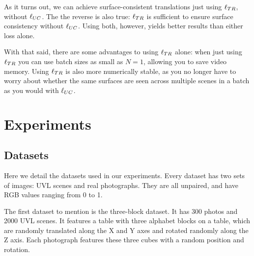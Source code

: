 \documentclass{article}
\begin{document}
		As it turns out, we can achieve surface-consistent translations just using $\ell_{TR}$, without $\ell_{UC}$.
		The the reverse is also true: $\ell_{TR}$ is sufficient to ensure surface consistency without $\ell_{UC}$.
		Using both, however, yields better results than either loss alone. 
		
		With that said, there are some advantages to using $\ell_{TR}$ alone: when just using $\ell_{TR}$ you can use batch sizes as small as $N=1$, allowing you to save video memory. 
		Using $\ell_{TR}$ is also more numerically stable, as you no longer have to worry about whether the same surfaces are seen across multiple scenes in a batch as you would with $\ell_{UC}$.





\section{Experiments}\label{sec:results}

\subsection{Datasets}
Here we detail the datasets used in our experiments. 
Every dataset has two sets of images: UVL scenes and real photographs. They are all unpaired, and have RGB values ranging from 0 to 1.

The first dataset to mention is the three-block dataset.  
It has 300 photos and 2000 UVL scenes. It features a table with three alphabet blocks on a table, which are randomly translated along the X and Y axes and rotated randomly along the Z axis. Each photograph features these three cubes with a random position and rotation.
\end{document}
